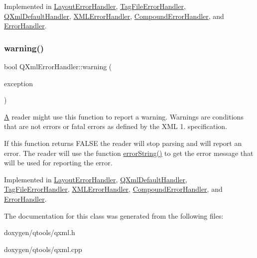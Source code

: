 Implemented in \mbox{\hyperlink{class_layout_error_handler_aca31cecb0d737ede70e22c86d038bbb4}{Layout\+Error\+Handler}}, \mbox{\hyperlink{class_tag_file_error_handler_a7562a9fb258c3d4005ea4a3327623e60}{Tag\+File\+Error\+Handler}}, \mbox{\hyperlink{class_q_xml_default_handler_a365448a99398f6939706d6e63e6b215d}{Q\+Xml\+Default\+Handler}}, \mbox{\hyperlink{class_x_m_l_error_handler_a7e3ad0aecf457ca44b284c71c1ab28bc}{X\+M\+L\+Error\+Handler}}, \mbox{\hyperlink{class_compound_error_handler_a64adb9938c3f3e70a76cc4a224f0d093}{Compound\+Error\+Handler}}, and \mbox{\hyperlink{class_error_handler_abb20bb96f3b3b743e1d5649d6c6be5a0}{Error\+Handler}}.

\mbox{\label{class_q_xml_error_handler_a79ae0cce3316a76b7777c6e90b101afe}} 
\subsubsection{\texorpdfstring{warning()}{warning()}}
{\footnotesize\ttfamily bool Q\+Xml\+Error\+Handler\+::warning (\begin{DoxyParamCaption}\item[{const \mbox{\hyperlink{class_q_xml_parse_exception}{Q\+Xml\+Parse\+Exception}} \&}]{exception }\end{DoxyParamCaption})\hspace{0.3cm}{\ttfamily [pure virtual]}}

\mbox{\hyperlink{class_a}{A}} reader might use this function to report a warning. Warnings are conditions that are not errors or fatal errors as defined by the X\+ML 1. specification.

If this function returns F\+A\+L\+SE the reader will stop parsing and will report an error. The reader will use the function \mbox{\hyperlink{class_q_xml_error_handler_a7b265803d41782e6207b497fe09beff0}{error\+String()}} to get the error message that will be used for reporting the error. 

Implemented in \mbox{\hyperlink{class_layout_error_handler_a463dfca8796fee3c40a08817d1af64be}{Layout\+Error\+Handler}}, \mbox{\hyperlink{class_q_xml_default_handler_acaabb9885b0d301b151112ea3e05f361}{Q\+Xml\+Default\+Handler}}, \mbox{\hyperlink{class_tag_file_error_handler_a5512c9023933b9a9a457f75f7654412a}{Tag\+File\+Error\+Handler}}, \mbox{\hyperlink{class_x_m_l_error_handler_ae24e6692734e1075c74d0417c1678548}{X\+M\+L\+Error\+Handler}}, \mbox{\hyperlink{class_compound_error_handler_a80ccb953cac3ead66ae9c8892d8e3c03}{Compound\+Error\+Handler}}, and \mbox{\hyperlink{class_error_handler_abb147190a3d48dae251d7db795d9e28d}{Error\+Handler}}.



The documentation for this class was generated from the following files\+:\begin{DoxyCompactItemize}
\item 
doxygen/qtools/qxml.\+h\item 
doxygen/qtools/qxml.\+cpp\end{DoxyCompactItemize}
